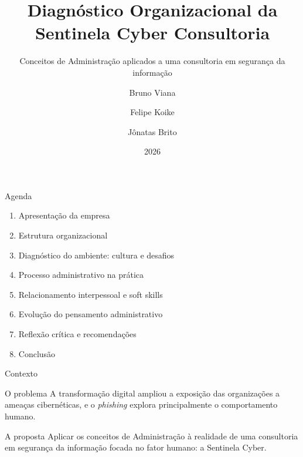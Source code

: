\documentclass[aspectratio=169,12pt]{beamer}
\title[Sentinela Cyber]{Diagnóstico Organizacional da Sentinela Cyber Consultoria}
\subtitle{Conceitos de Administração aplicados a uma consultoria em segurança da informação}
\author{Bruno Viana \and Felipe Koike \and Jônatas Brito}
\institute{Universidade Presbiteriana Mackenzie \\ Administração de Negócios -- Avaliação N2}
\date{2026}
\begin{document}
\begin{frame}[plain]
  \titlepage
\end{frame}

\begin{frame}{Agenda}
  \begin{enumerate}
    \item Apresentação da empresa
    \item Estrutura organizacional
    \item Diagnóstico do ambiente: cultura e desafios
    \item Processo administrativo na prática
    \item Relacionamento interpessoal e soft skills
    \item Evolução do pensamento administrativo
    \item Reflexão crítica e recomendações
    \item Conclusão
  \end{enumerate}
\end{frame}

\begin{frame}{Contexto}
  \begin{block}{O problema}
    A transformação digital ampliou a exposição das organizações a ameaças
    cibernéticas, e o \textit{phishing} explora principalmente o comportamento
    humano.
  \end{block}
  \begin{block}{A proposta}
    Aplicar os conceitos de Administração à realidade de uma consultoria em
    segurança da informação focada no fator humano: a Sentinela Cyber.
  \end{block}
\end{frame}
\end{document}
